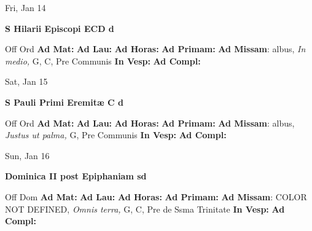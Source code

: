 \documentclass[10pt]{memoir}
\begin{document}
\begin{center}
\begin{minipage}{3.5in}
\vspace{2em}
\begin{center}Fri, Jan 14
\end{center}
\textbf{ \large S Hilarii Episcopi ECD
\textnormal{\normalsize d}}

\begin{justify}Off Ord
\textbf{Ad Mat: }
\textbf{Ad Lau: }
\textbf{Ad Horas: }
\textbf{Ad Primam: }\textbf{Ad Missam}: albus, \textit{In medio,} G, C, Pre Communis
\textbf{In Vesp: }
\textbf{Ad Compl: }
\end{justify}
\end{minipage}
\end{center}

\begin{center}
\begin{minipage}{3.5in}
\vspace{2em}
\begin{center}Sat, Jan 15
\end{center}
\textbf{ \large S Pauli Primi Eremitæ C
\textnormal{\normalsize d}}

\begin{justify}Off Ord
\textbf{Ad Mat: }
\textbf{Ad Lau: }
\textbf{Ad Horas: }
\textbf{Ad Primam: }\textbf{Ad Missam}: albus, \textit{Justus ut palma,} G, Pre Communis
\textbf{In Vesp: }
\textbf{Ad Compl: }
\end{justify}
\end{minipage}
\end{center}

\begin{center}
\begin{minipage}{3.5in}
\vspace{2em}
\begin{center}Sun, Jan 16
\end{center}
\textbf{ \large Dominica II post Epiphaniam
\textnormal{\normalsize sd}}

\begin{justify}Off Dom
\textbf{Ad Mat: }
\textbf{Ad Lau: }
\textbf{Ad Horas: }
\textbf{Ad Primam: }\textbf{Ad Missam}: COLOR NOT DEFINED, \textit{Omnis terra,} G, C, Pre de Ssma Trinitate
\textbf{In Vesp: }
\textbf{Ad Compl: }
\end{justify}
\end{minipage}
\end{center}
\end{document}
